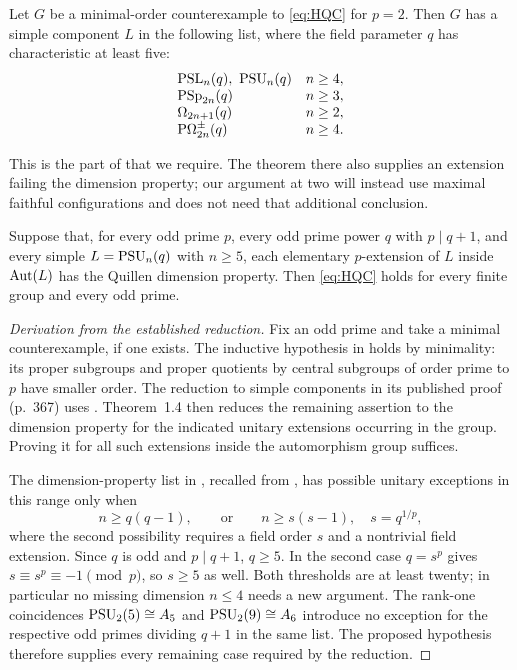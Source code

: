 \begin{theorem}\label{thm:reduction-two}
Let $G$ be a minimal-order counterexample to \eqref{eq:HQC} for $p=2$.
Then $G$ has a simple component $L$ in the following list, where the
field parameter $q$ has characteristic at least five:
\[
\begin{array}{ll}
\operatorname{PSL}_n(q),\ \operatorname{PSU}_n(q)& n\geq4,\\
\operatorname{PSp}_{2n}(q)& n\geq3,\\
\Omega_{2n+1}(q)& n\geq2,\\
\mathrm P\Omega_{2n}^{\pm}(q)& n\geq4.
\end{array}
\]
\end{theorem}

This is the part of \citet[Theorem~B]{Piterman2026} that we require.
The theorem there also supplies an extension failing the dimension
property; our argument at two will instead use maximal faithful
configurations and does not need that additional conclusion.

\begin{theorem}\label{thm:reduction-odd}
Suppose that, for every odd prime $p$, every odd prime power $q$ with
$p\mid q+1$, and every simple $L=\operatorname{PSU}_n(q)$ with $n\geq5$, each
elementary $p$-extension of $L$ inside $\operatorname{Aut}(L)$ has the Quillen
dimension property. Then \eqref{eq:HQC} holds for every finite group
and every odd prime.
\end{theorem}

\begin{proof}[Derivation from the established reduction]
Fix an odd prime and take a minimal counterexample, if one exists.
The inductive hypothesis in \citet[Theorem~1.4]{PitermanSmith2025}
holds by minimality: its proper subgroups and proper quotients by
central subgroups of order prime to $p$ have smaller order.
The reduction to simple components in its published proof (p.~367)
uses \citet[Theorem~2.22(2) and Lemma~2.3]{PitermanSmith2025}.
Theorem~1.4 then reduces the
remaining assertion to the dimension property for the indicated
unitary extensions occurring in the group. Proving it for all such
extensions inside the automorphism group suffices.

The dimension-property list in
\citet[Theorem~2.16(2)]{PitermanSmith2025}, recalled from
\citet[Theorem~3.1]{AschbacherSmith1993}, has possible unitary exceptions in this
range only when
\[
n\geq q(q-1),
\qquad\text{or}\qquad
n\geq s(s-1),\quad s=q^{1/p},
\]
where the second possibility requires a field order $s$ and a
nontrivial field extension. Since $q$ is odd and $p\mid q+1$,
$q\geq5$. In the second case $q=s^p$ gives
$s\equiv s^p\equiv-1\pmod p$, so $s\geq5$ as well.
Both thresholds are at least twenty; in particular no missing
dimension $n\leq4$ needs a new argument. The rank-one coincidences
$\operatorname{PSU}_2(5)\cong A_5$ and $\operatorname{PSU}_2(9)\cong A_6$
\citep[Theorems~10.9 and~4.6(ii),(iv)]{Taylor1992} introduce no
exception for the respective odd primes dividing $q+1$ in the same
list. The proposed hypothesis therefore supplies every remaining
case required by the reduction.
\end{proof}

